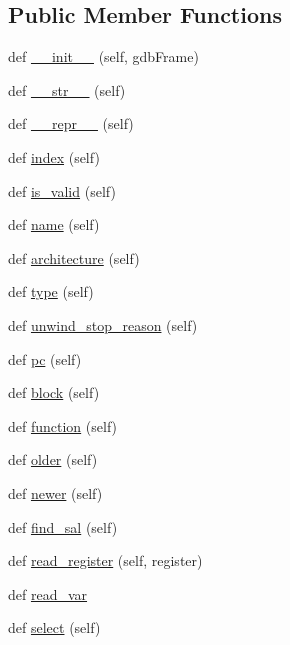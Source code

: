 \subsection*{Public Member Functions}
\begin{DoxyCompactItemize}
\item 
def \hyperlink{classmemoryoracle_1_1frame_1_1Frame_aea518e57d5d0c5c49b21a429586cecb6}{\+\_\+\+\_\+init\+\_\+\+\_\+} (self, gdb\+Frame)
\item 
def \hyperlink{classmemoryoracle_1_1frame_1_1Frame_a525bebac0252f1497ede1877d19943c2}{\+\_\+\+\_\+str\+\_\+\+\_\+} (self)
\item 
def \hyperlink{classmemoryoracle_1_1frame_1_1Frame_a527dc6f632f917ca04958b6c24fbbe0d}{\+\_\+\+\_\+repr\+\_\+\+\_\+} (self)
\item 
def \hyperlink{classmemoryoracle_1_1frame_1_1Frame_aba4a80563b93cf0069db8d64df6b19e5}{index} (self)
\item 
def \hyperlink{classmemoryoracle_1_1frame_1_1Frame_a34ad62ac1cb07425d926b8517fc0e8a3}{is\+\_\+valid} (self)
\item 
def \hyperlink{classmemoryoracle_1_1frame_1_1Frame_a34903b0f51d554e95b269e5e1d6f1b16}{name} (self)
\item 
def \hyperlink{classmemoryoracle_1_1frame_1_1Frame_af2d3193c34935f35f3572e355281fa04}{architecture} (self)
\item 
def \hyperlink{classmemoryoracle_1_1frame_1_1Frame_ad9f0207e267a432373b45b1d62e542ef}{type} (self)
\item 
def \hyperlink{classmemoryoracle_1_1frame_1_1Frame_a5c774c5d00aaabe4ca4354c6b4b7c776}{unwind\+\_\+stop\+\_\+reason} (self)
\item 
def \hyperlink{classmemoryoracle_1_1frame_1_1Frame_aa144522109598a81caa75d43d9a771fb}{pc} (self)
\item 
def \hyperlink{classmemoryoracle_1_1frame_1_1Frame_a32271fc6665af8493ea60b4c06adf152}{block} (self)
\item 
def \hyperlink{classmemoryoracle_1_1frame_1_1Frame_a16c07293c0c0c88f15b1f11f958e2e73}{function} (self)
\item 
def \hyperlink{classmemoryoracle_1_1frame_1_1Frame_a8d7cf9a71e1802402e13bbfb83f9339e}{older} (self)
\item 
def \hyperlink{classmemoryoracle_1_1frame_1_1Frame_a8851b7c3adc1783072e53d5cff3ce4c4}{newer} (self)
\item 
def \hyperlink{classmemoryoracle_1_1frame_1_1Frame_a45836a639752efedc2073a419dbde634}{find\+\_\+sal} (self)
\item 
def \hyperlink{classmemoryoracle_1_1frame_1_1Frame_ad5bb885a0accba9ff8f15c6b0e51bfc4}{read\+\_\+register} (self, register)
\item 
def \hyperlink{classmemoryoracle_1_1frame_1_1Frame_ae54a6f6a355f6bb63162d2a78a761c30}{read\+\_\+var}
\item 
def \hyperlink{classmemoryoracle_1_1frame_1_1Frame_a175c100c2d7fbd26de22ba6c37d6d4ec}{select} (self)
\end{DoxyCompactItemize}
